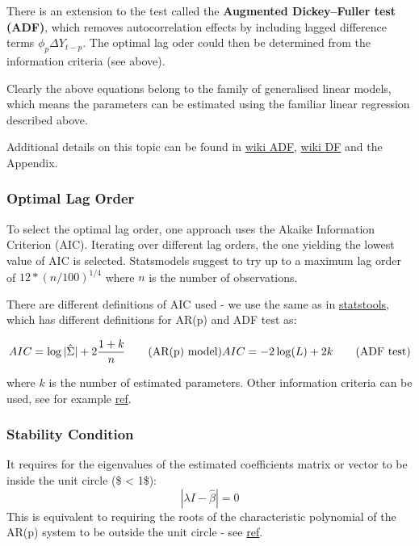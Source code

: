 \documentclass{article}
\begin{document}
There is an extension to the test called the \textbf{Augmented
Dickey--Fuller test (ADF)}, which removes autocorrelation effects by
including lagged difference terms \(\phi_p \Delta Y_{t-p}\). The optimal
lag oder could then be determined from the information criteria (see
above).

Clearly the above equations belong to the family of generalised linear
models, which means the parameters can be estimated using the familiar
linear regression described above.

Additional details on this topic can be found in
\href{https://en.wikipedia.org/wiki/Augmented_Dickey\%E2\%80\%93Fuller_test}{wiki
ADF},
\href{https://en.wikipedia.org/wiki/Dickey\%E2\%80\%93Fuller_test}{wiki
DF} and the Appendix.

    \subsubsection{Optimal Lag Order}\label{optimal-lag-order}

To select the optimal lag order, one approach uses the Akaike
Information Criterion (AIC). Iterating over different lag orders, the
one yielding the lowest value of AIC is selected. Statsmodels suggest to
try up to a maximum lag order of \(12*(n/100)^{1/4}\) where \(n\) is the
number of observations.

There are different definitions of AIC used - we use the same as in
\href{http://statsmodels.sourceforge.net/stable/vector_ar.html\#lag-order-selection}{statstools},
which has different definitions for AR(p) and ADF test as:

\[
\begin{equation}
AIC = \log | \hat{\Sigma} |+ 2 \frac{1 + k}{n} \qquad \mathrm{(AR(p) \ model)} \\
AIC = -2 \log(L) + 2k  \qquad \mathrm{(ADF \ test)} 
\end{equation}
\]

where \(k\) is the number of estimated parameters. Other information
criteria can be used, see for example
\href{https://en.wikipedia.org/wiki/Information_criterion}{ref}.

    \subsubsection{Stability Condition}\label{stability-condition}

It requires for the eigenvalues of the estimated coefficients matrix or
vector to be inside the unit circle (\$ \textless{} 1\$): \[
| \lambda I - \hat{\beta} | = 0
\] This is equivalent to requiring the roots of the characteristic
polynomial of the AR(p) system to be outside the unit circle - see
\href{http://matthieustigler.github.io/Lectures/Lect2ARMA.pdf}{ref}.
\end{document}
